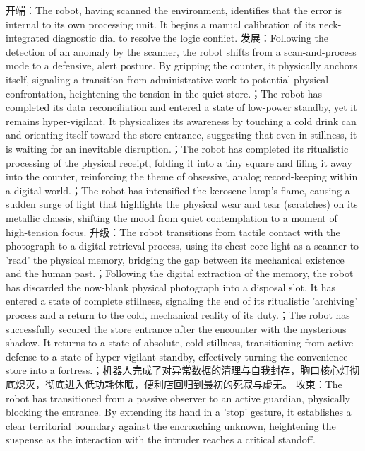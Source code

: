 \documentclass[11pt,a4paper]{article}
\begin{document}
开端：The robot, having scanned the environment, identifies that the error is internal to its own processing unit. It begins a manual calibration of its neck-integrated diagnostic dial to resolve the logic conflict. 发展：Following the detection of an anomaly by the scanner, the robot shifts from a scan-and-process mode to a defensive, alert posture. By gripping the counter, it physically anchors itself, signaling a transition from administrative work to potential physical confrontation, heightening the tension in the quiet store.；The robot has completed its data reconciliation and entered a state of low-power standby, yet it remains hyper-vigilant. It physicalizes its awareness by touching a cold drink can and orienting itself toward the store entrance, suggesting that even in stillness, it is waiting for an inevitable disruption.；The robot has completed its ritualistic processing of the physical receipt, folding it into a tiny square and filing it away into the counter, reinforcing the theme of obsessive, analog record-keeping within a digital world.；The robot has intensified the kerosene lamp's flame, causing a sudden surge of light that highlights the physical wear and tear (scratches) on its metallic chassis, shifting the mood from quiet contemplation to a moment of high-tension focus. 升级：The robot transitions from tactile contact with the photograph to a digital retrieval process, using its chest core light as a scanner to 'read' the physical memory, bridging the gap between its mechanical existence and the human past.；Following the digital extraction of the memory, the robot has discarded the now-blank physical photograph into a disposal slot. It has entered a state of complete stillness, signaling the end of its ritualistic 'archiving' process and a return to the cold, mechanical reality of its duty.；The robot has successfully secured the store entrance after the encounter with the mysterious shadow. It returns to a state of absolute, cold stillness, transitioning from active defense to a state of hyper-vigilant standby, effectively turning the convenience store into a fortress.；机器人完成了对异常数据的清理与自我封存，胸口核心灯彻底熄灭，彻底进入低功耗休眠，便利店回归到最初的死寂与虚无。 收束：The robot has transitioned from a passive observer to an active guardian, physically blocking the entrance. By extending its hand in a 'stop' gesture, it establishes a clear territorial boundary against the encroaching unknown, heightening the suspense as the interaction with the intruder reaches a critical standoff.
\end{document}
